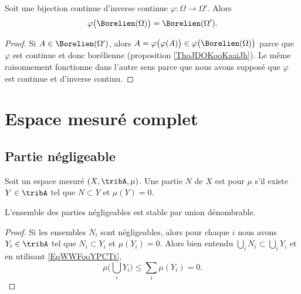 \begin{proposition}     
    Soit une bijection continue d'inverse continue \( \varphi\colon \Omega\to \Omega'\). Alors
    \begin{equation}
        \varphi\big( \Borelien(\Omega) \big)=\Borelien(\Omega').
    \end{equation}
\end{proposition}

\begin{proof}
    Si \( A\in \Borelien(\Omega')\), alors \( A=\varphi\big( \varphi(A) \big)\in\varphi\big( \Borelien(\Omega) \big)\) parce que \( \varphi\) est continue et donc borélienne (proposition \ref{ThoJDOKooKaaiJh}). Le même raisonnement fonctionne dans l'autre sens parce que nous avons supposé que \( \varphi\) est continue et d'inverse continu.
\end{proof}

\section{Espace mesuré complet}

\subsection{Partie négligeable}

\begin{definition}  \label{DefAVDoomkuXi}
    Soit un espace mesuré \( (X,\tribA,\mu)\). Une partie \( N\) de \( X\) est  pour \( \mu\) s'il existe \( Y\in\tribA\) tel que \( N\subset Y\) et \( \mu(Y)=0\).
\end{definition}

\begin{lemma}   \label{LemVKNooOCOQw}
    L'ensemble des parties négligeables est stable par union dénombrable.
\end{lemma}

\begin{proof}
    Si les ensembles \( N_i\) sont négligeables, alors pour chaque \( i\) nous avons \( Y_i\in\tribA\) tel que \( N_i\subset Y_i\) et \( \mu(Y_i)=0\). Alors bien entendu \( \bigcup_iN_i\subset \bigcup_iY_i\) et en utilisant \eqref{EqWWFooYPCTt},
    \begin{equation}
        \mu\big( \bigcup_iY_i \big)\leq \sum_i\mu(Y_i)=0.
    \end{equation}
\end{proof}

